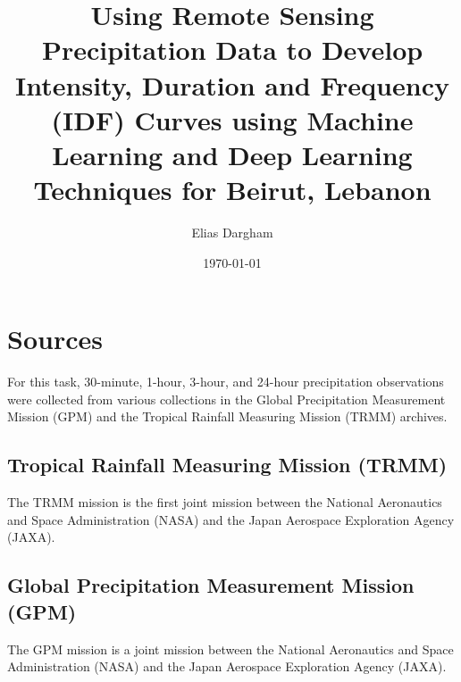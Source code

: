 \documentclass[
  12pt,
  a4paper,
]{article}
\author{Elias Dargham}
\title{Using Remote Sensing Precipitation Data to Develop Intensity, Duration and Frequency (IDF) Curves using Machine Learning and Deep Learning Techniques for Beirut, Lebanon}
\date{\today}
\begin{document}
\maketitle





\section{Sources}
For this task, 30-minute, 1-hour, 3-hour, and 24-hour precipitation observations were collected from various collections in the Global Precipitation Measurement Mission (GPM) and the Tropical Rainfall Measuring Mission (TRMM) archives.

\subsection*{Tropical Rainfall Measuring Mission (TRMM)}
The TRMM mission is the first joint mission between the National Aeronautics and Space Administration (NASA) and the Japan Aerospace Exploration Agency (JAXA).

\subsection*{Global Precipitation Measurement Mission (GPM)}
The GPM mission is a joint mission between the National Aeronautics and Space Administration (NASA) and the Japan Aerospace Exploration Agency (JAXA).



\end{document}
